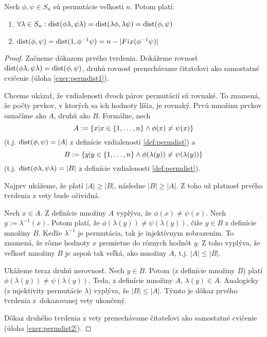 \begin{theorem}
\label{thm:permdist}
Nech $\phi, \psi \in S_n$ sú permutácie veľkosti $n$. Potom platí:

\begin{enumerate}
    \item $\forall \lambda \in S_n: {\rm dist}(\phi \lambda, \psi \lambda) = {\rm dist}(\lambda \phi, \lambda \psi) = {\rm dist}(\phi, \psi)$
    \item ${\rm dist}(\phi, \psi) = {\rm dist}(1, \phi^{-1} \psi) = n - |Fix(\phi^{-1} \psi)|$
\end{enumerate}
\end{theorem}
\begin{proof}
Začneme dôkazom prvého tvrdenia. 
Dokážeme rovnosť ${\rm dist}(\phi \lambda, \psi \lambda) = {\rm dist}(\phi, \psi)$, druhú rovnosť prenechávame čitateľovi ako samostatné cvičenie (úloha \ref{exer:permdist1}).

Chceme ukázať, že vzdialenosti dvoch párov permutácií sú rovnaké. 
To znamená, že počty prvkov, v ktorých sa ich hodnoty líšia, je rovnaký.
Prvú množinu prvkov označíme ako $A$, druhú ako $B$. 
Formálne, nech 
$$A := \left\{x | x \in \left\{1, \ldots, n\right\} \wedge \phi(x) \neq \psi(x)\right\}$$
(t.j. ${\rm dist}(\phi, \psi) = |A|$ z definície vzdialenosti \ref{def:permdist}) a 
$$B := \left\{y | y \in \left\{1, \ldots, n\right\} \wedge \phi(\lambda(y)) \neq \psi(\lambda(y))\right\}$$ 
(t.j. ${\rm dist}(\phi\lambda, \psi\lambda) = |B|$ z definície vzdialenosti \ref{def:permdist}).

Najprv ukážeme, že platí $|A| \geq |B|$, následne $|B| \geq |A|$.
Z toho už platnosť prvého tvrdenia z vety bude očividná.

Nech $x \in A$. 
Z definície množiny $A$ vyplýva, že $\phi(x) \neq \psi(x)$. 
Nech $y := \lambda^{-1}(x)$. Potom platí, že $\phi(\lambda(y)) \neq \psi(\lambda(y))$, čiže $y \in B$ z definície množiny $B$.
Keďže $\lambda^{-1}$ je permutácia, tak je injektívnym zobrazením. 
To znamená, že rôzne hodnoty $x$ premietne do rôznych hodnôt $y$. 
Z toho vyplýva, že veľkosť množiny $B$ je aspoň tak veľká, ako množiny $A$, t.j. $|A| \leq |B|$.

Ukážeme teraz druhú nerovnosť. 
Nech $y \in B$. 
Potom (z definície množiny $B$) platí $\phi(\lambda(y)) \neq \psi(\lambda(y))$. 
Teda, z definície množiny $A$, $\lambda(y) \in A$.
Analogicky (z injektivity permutácie $\lambda$) vyplýva, že $|B| \leq |A|$.
Týmto je dôkaz prvého tvrdenia z~dokazovanej vety ukončený.

Dôkaz druhého tvrdenia z vety prenechávame čitateľovi ako samostatné cvičenie (úloha \ref{exer:permdist2}).
\end{proof}

